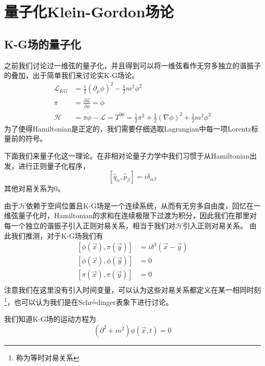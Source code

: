 \chapter{量子化Klein-Gordon场论}
\section{K-G场的量子化}
之前我们讨论过一维弦的量子化，并且得到可以将一维弦看作无穷多独立的谐振子的叠加，出于简单我们来讨论实K-G场论。
\begin{equation}
\begin{aligned}
    \mathcal{L}_{KG}&=\frac{1}{2}(\partial_{\mu}\phi)^{2}-\frac{1}{2}m^{2}\phi^{2}\\
    \pi &=\frac{\partial \mathcal{L}}{\partial \dot{\phi}}=\dot{\phi}\\
    \mathcal{H}&=\pi\dot{\phi}-\mathcal{L}=T^{00}=\frac{1}{2}\pi^{2}+\frac{1}{2}(\nabla \phi)^{2}+\frac{1}{2}m^{2}\phi^{2}
    \end{aligned}
\end{equation}
为了使得Hamiltonian是正定的，我们需要仔细选取Lagrangian中每一项Lorentz标量前的符号。

下面我们来量子化这一理论。在非相对论量子力学中我们习惯于从Hamiltonian出发，进行正则量子化程序，
\begin{equation}
\left[\hat{q}_{\alpha},\hat{p}_{\beta}\right]=i\delta_{\alpha \beta}
\end{equation}
其他对易关系为0。

由于$\mathcal{H}$依赖于空间位置且K-G场是一个连续系统，从而有无穷多自由度，回忆在一维弦量子化时，Hamiltonian的求和在连续极限下过渡为积分，因此我们在那里对每一个独立的谐振子引入正则对易关系，相当于我们对$\mathcal{H}$引入正则对易关系。
由此我们推测，对于K-G场我们有
\begin{equation}
\label{chap3commu}
    \begin{aligned}
        \left[\phi(\vec{x}),\pi(\vec{y})\right]&=i\delta^{3}\left(\vec{x}-\vec{y}\right)\\
        \left[\phi(\vec{x}),\phi(\vec{y})\right]&=0\\
        \left[\pi(\vec{x}),\pi(\vec{y})\right]&=0\\
    \end{aligned}
\end{equation}
注意我们在这里没有引入时间变量，可以认为这些对易关系都定义在某一相同时刻\footnote{称为等时对易关系}，也可以认为我们是在Schr$\ddot{\rm{o}}$dinger表象下进行讨论。

我们知道K-G场的运动方程为
\begin{equation}
   \left(\partial^{2}+m^{2}\right)\phi(\vec{x},t)=0
\end{equation}

